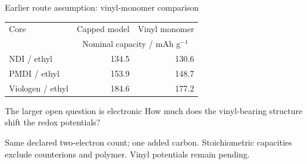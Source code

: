 \begin{frame}{Earlier route assumption: vinyl-monomer comparison}
\centering\renewcommand{\arraystretch}{1.65}
\begin{tabular}{@{}lrr@{}}\toprule
Core & Capped model & Vinyl monomer \\
& \multicolumn{2}{c}{Nominal capacity / mAh g$^{-1}$} \\ \midrule
NDI / ethyl & 134.5 & 130.6 \\
PMDI / ethyl & 153.9 & 148.7 \\
Viologen / ethyl & 184.6 & 177.2 \\
\bottomrule\end{tabular}
\vspace{1em}\begin{block}{The larger open question is electronic}
How much does the vinyl-bearing structure shift the redox potentials?
\end{block}
\footnotesize Same declared two-electron count; one added carbon. Stoichiometric capacities exclude counterions and polymer. Vinyl potentials remain pending.
\end{frame}
